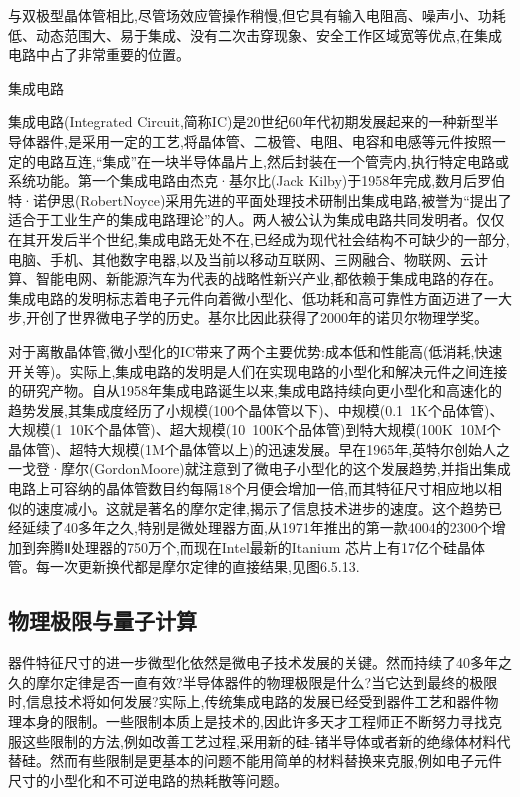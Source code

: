 与双极型晶体管相比,尽管场效应管操作稍慢,但它具有输入电阻高、噪声小、功耗低、动态范围大、易于集成、没有二次击穿现象、安全工作区域宽等优点,在集成电路中占了非常重要的位置。

集成电路

集成电路(Integrated Circuit,简称IC)是20世纪60年代初期发展起来的一种新型半导体器件,是采用一定的工艺,将晶体管、二极管、电阻、电容和电感等元件按照一定的电路互连,“集成”在一块半导体晶片上,然后封装在一个管壳内,执行特定电路或系统功能。第一个集成电路由杰克·基尔比(Jack Kilby)于1958年完成,数月后罗伯特·诺伊思(RobertNoyce)采用先进的平面处理技术研制出集成电路,被誉为“提出了适合于工业生产的集成电路理论”的人。两人被公认为集成电路共同发明者。仅仅在其开发后半个世纪,集成电路无处不在,已经成为现代社会结构不可缺少的一部分,电脑、手机、其他数字电器,以及当前以移动互联网、三网融合、物联网、云计算、智能电网、新能源汽车为代表的战略性新兴产业,都依赖于集成电路的存在。集成电路的发明标志着电子元件向着微小型化、低功耗和高可靠性方面迈进了一大步,开创了世界微电子学的历史。基尔比因此获得了2000年的诺贝尔物理学奖。

对于离散晶体管,微小型化的IC带来了两个主要优势:成本低和性能高(低消耗,快速开关等)。实际上,集成电路的发明是人们在实现电路的小型化和解决元件之间连接的研究产物。自从1958年集成电路诞生以来,集成电路持续向更小型化和高速化的趋势发展,其集成度经历了小规模(100个晶体管以下)、中规模(0.1~1K个品体管)、大规模(1~10K个晶体管)、超大规模(10~100K个品体管)到特大规模(100K~10M个晶体管)、超特大规模(1M个晶体管以上)的迅速发展。早在1965年,英特尔创始人之一戈登·摩尔(GordonMoore)就注意到了微电子小型化的这个发展趋势,并指出集成电路上可容纳的晶体管数目约每隔18个月便会增加一倍,而其特征尺寸相应地以相似的速度减小。这就是著名的摩尔定律,揭示了信息技术进步的速度。这个趋势已经延续了40多年之久,特别是微处理器方面,从1971年推出的第一款4004的2300个增加到奔腾Ⅱ处理器的750万个,而现在Intel最新的Itanium 芯片上有17亿个硅晶体管。每一次更新换代都是摩尔定律的直接结果,见图6.5.13.



\subsection{物理极限与量子计算}

器件特征尺寸的进一步微型化依然是微电子技术发展的关键。然而持续了40多年之久的摩尔定律是否一直有效?半导体器件的物理极限是什么?当它达到最终的极限时,信息技术将如何发展?实际上,传统集成电路的发展已经受到器件工艺和器件物理本身的限制。一些限制本质上是技术的,因此许多天才工程师正不断努力寻找克服这些限制的方法,例如改善工艺过程,采用新的硅-锗半导体或者新的绝缘体材料代替硅。然而有些限制是更基本的问题不能用简单的材料替换来克服,例如电子元件尺寸的小型化和不可逆电路的热耗散等问题。

